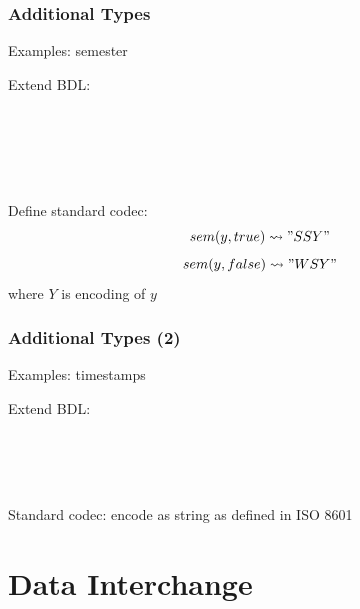 \begin{frame}\frametitle{Additional Types}
Examples: semester

Extend BDL:
\begin{commgrammar}
\\
\\
\\
\\
\end{commgrammar}

Define standard codec:
\[sem(y,true) \rightsquigarrow "SSY"\]
\[sem(y,false) \rightsquigarrow "WSY"\]
where $Y$ is encoding of $y$
\end{frame}

\begin{frame}\frametitle{Additional Types (2)}
Examples: timestamps

Extend BDL:
\begin{commgrammar}
\\
\\
\\
\end{commgrammar}

Standard codec: encode as string as defined in ISO 8601
\end{frame}

\section{Data Interchange}

